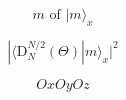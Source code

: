\documentclass[12pt]{article}
\begin{document}
\[m\text{ of }|m\rangle_x\]

\[|\langle \text{D}_{N}^{N/2}(\Theta)| m\rangle_x|^2\]

\[Ox Oy Oz\]
\end{document}

